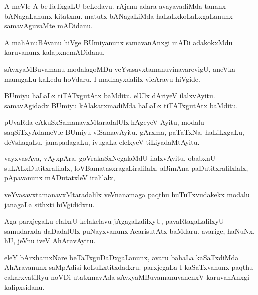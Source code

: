 \documentclass{article}
\begin{document}
\begin{mn}
A meVle A beTaTxgaLU beLedavu.  rAjanu adara avayavadiMda tananx bANagaLanunx 
kitatxnu. matutx bANagaLiMda haLaLxkoLaLxgaLanunx samavAguvaMte  mADidanu.
\end{mn}

\begin{mn}
A mahAnuBAvanu hiVge BUmiyanunx samavanAnxgi mADi adakokxMdu karuvanunx kalapxnemADidanu.
\end{mn}

\begin{mn}
sAvxyaMBuvamanu modalagoMDu veYvasavxtamanuvinavarevigU, aneVka manugaLu 
kaLedu hoVdaru. I madhayxdalilx vicAravu hiVgide. 
\end{mn}

\begin{mn}
BUmiyu haLaLx tiTATxgutAtx baMditu.  elUlx dAriyeV ilalxvAyitu.  samavAgidadx 
BUmiyu kAlakarxmadiMda haLaLx tiTATxgutAtx baMditu.
\end{mn}

\begin{mn}
pUvaRda cAkuSxSamanavxMtaradalUlx hAgeyeV Ayitu, modalu saqSiTxyAdameVle BUmiyu 
viSamavAyitu.  gArxma, paTaTxNa. haLiLxgaLu, deVshagaLu, janapadagaLu,  
ivugaLa elelxyeV tiLiyadaMtAyitu.
\end{mn}

\begin{mn}
vayxvasAya, vAyxpAra, goVrakaSxNegaloMdU ilalxvAyitu. obabxnU suLALxDutitxralilalx, 
loVBamatasxragaLiralilalx,  aBimAna paDutitxralilxlalx, pApavanunx mADutatxleV iralilalx, 
\end{mn}

\begin{mn}
veYvasavxtamanavxMtaradalilx  veVnanamaga paqthu  huTuTxvudakekx  modalu janagaLa sithxti hiVgididxtu. 
\end{mn}

\begin{mn}
Aga parxjegaLu elalxrU kelakelavu jAgagaLalilxyU, pavaRtagaLalilxyU samudarxda 
daDadalUlx puNayxvanunx AcarisutAtx baMdaru.  avarige, haNuNx, hU, jeVnu iveV AhAravAyitu.
\end{mn}

\begin{mn}
eleY bArxhamxNare beTaTxguDaDxgaLanunx, avaru bahaLa kaSaTxdiMda AhAravanunx saMpAdisi 
koLuLxtitxdadxru.  parxjegaLa I kaSaTxvanunx paqthu cakarxvatiRyu noVDi 
utatxmavAda sAvxyaMBuvamanuvanenxV karuvanAnxgi kalipxsidanu.
\end{mn}
\end{document}
